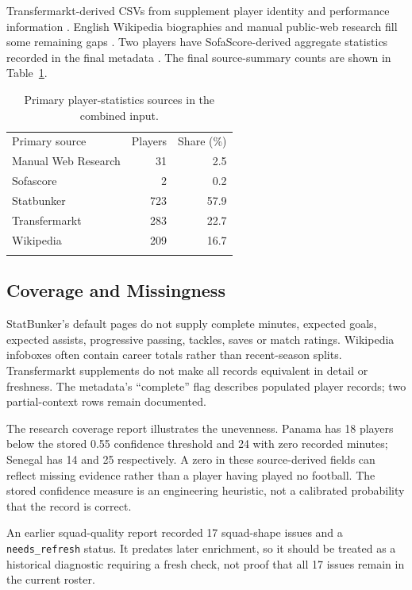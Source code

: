 \documentclass[11pt,a4paper]{article}
\newcommand{\toprule}{\noalign{\hrule height 0.8pt}\noalign{\vskip 3pt}}
\newcommand{\midrule}{\noalign{\vskip 2pt}\noalign{\hrule height 0.4pt}\noalign{\vskip 3pt}}
\newcommand{\bottomrule}{\noalign{\vskip 3pt}\noalign{\hrule height 0.8pt}}
\begin{document}
Transfermarkt-derived CSVs from  supplement player
identity and performance information \cite{data-transfermarkt}. English Wikipedia
biographies and manual public-web research fill some remaining gaps
\cite{data-wikipedia}. Two players have SofaScore-derived aggregate statistics
recorded in the final metadata \cite{data-sofascore}. The final source-summary
counts are shown in Table~\ref{tab:coverage}.
\clearpage
\begin{table}[ht]
\centering\small
\caption{Primary player-statistics sources in the combined input.\label{tab:coverage}}
\begin{tabular}{lrr}
\toprule
Primary source & Players & Share (\%) \\
\midrule
Manual Web Research & 31 & 2.5 \\
Sofascore & 2 & 0.2 \\
Statbunker & 723 & 57.9 \\
Transfermarkt & 283 & 22.7 \\
Wikipedia & 209 & 16.7 \\
\bottomrule
\end{tabular}
\end{table}
\subsection{Coverage and Missingness}
StatBunker's default pages do not supply complete minutes, expected goals,
expected assists, progressive passing, tackles, saves or match ratings. Wikipedia
infoboxes often contain career totals rather than recent-season splits.
Transfermarkt supplements do not make all records equivalent in detail or
freshness. The metadata's ``complete'' flag describes populated player records;
two partial-context rows remain documented.

The research coverage report illustrates the unevenness. Panama has 18 players
below the stored 0.55 confidence threshold and 24 with zero recorded minutes;
Senegal has 14 and 25 respectively. A zero in these source-derived fields can
reflect missing evidence rather than a player having played no football.
The stored confidence measure is an engineering heuristic, not a calibrated
probability that the record is correct.

An earlier squad-quality report recorded 17 squad-shape issues and a
\texttt{needs\_refresh} status. It predates later enrichment, so it should be
treated as a historical diagnostic requiring a fresh check, not proof that all
17 issues remain in the current roster.
\end{document}
